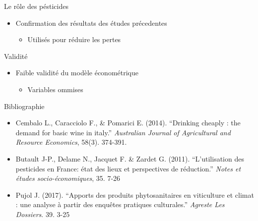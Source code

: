 \documentclass[11pt,ignorenonframetext,]{beamer}
\providecommand{\tightlist}{%
  \setlength{\itemsep}{0pt}\setlength{\parskip}{0pt}}
\begin{document}
\begin{frame}{Le rôle des pésticides}
\protect\hypertarget{le-role-des-pesticides}{}

\begin{itemize}
\tightlist
\item
  Confirmation des résultats des études précedentes

  \begin{itemize}
  \tightlist
  \item
    Utilisés pour réduire les pertes
  \end{itemize}
\end{itemize}

\end{frame}

\begin{frame}{Validité}
\protect\hypertarget{validite}{}

\begin{itemize}
\tightlist
\item
  Faible validité du modèle économétrique

  \begin{itemize}
  \tightlist
  \item
    Variables ommises
  \end{itemize}
\end{itemize}

\end{frame}

\begin{frame}{Bibliographie}
\protect\hypertarget{bibliographie}{}

\begin{itemize}
\tightlist
\item
  Cembalo L., Caracciolo F., \& Pomarici E. (2014). ``Drinking cheaply :
  the demand for basic wine in italy.'' \emph{Australian Journal of
  Agricultural and Resource Economics}, 58(3). 374-391.
\item
  Butault J-P., Delame N., Jacquet F. \& Zardet G. (2011).
  ``L'utilisation des pesticides en France: état des lieux et
  perspectives de réduction.'' \emph{Notes et études socio-économiques},
  35. 7-26
\item
  Pujol J. (2017). ``Apports des produits phytosanitaires en viticulture
  et climat : une analyse à partir des enquêtes pratiques culturales.''
  \emph{Agreste Les Dossiers}. 39. 3-25
\end{itemize}

\end{frame}
\end{document}
